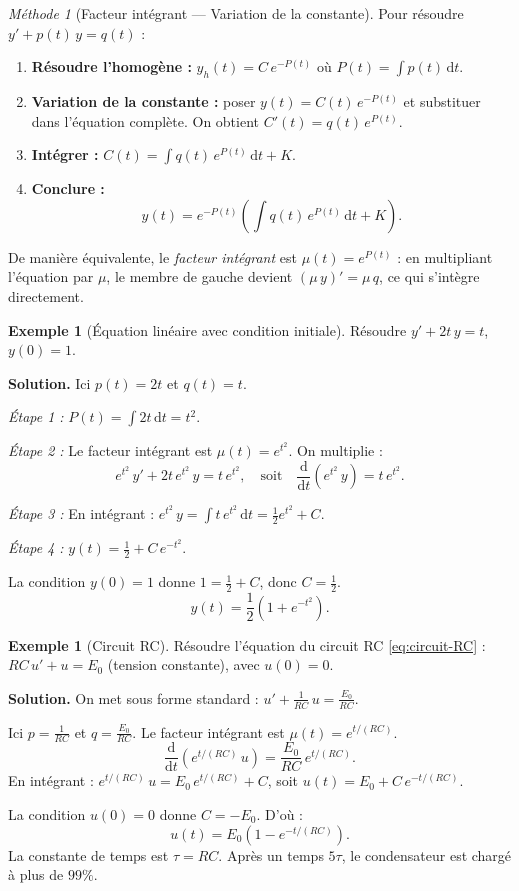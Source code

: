 \documentclass[12pt,a4paper,openany]{book}
\theoremstyle{definition}
\newtheorem{exemple}[definition]{Exemple}
\theoremstyle{plain}
\theoremstyle{remark}
\newtheorem{methode}[definition]{Méthode}
\newcommand{\dd}{\mathrm{d}}
\begin{document}
\begin{methode}[Facteur intégrant --- Variation de la constante]
\label{meth:facteur-integrant}
Pour résoudre $y' + p(t)\,y = q(t)$ :
\begin{enumerate}
\item \textbf{Résoudre l'homogène :} $y_h(t) = C\,e^{-P(t)}$ où $P(t) = \int p(t)\,\dd t$.
\item \textbf{Variation de la constante :} poser $y(t) = C(t)\,e^{-P(t)}$ et substituer dans l'équation complète. On obtient $C'(t) = q(t)\,e^{P(t)}$.
\item \textbf{Intégrer :} $C(t) = \int q(t)\,e^{P(t)}\,\dd t + K$.
\item \textbf{Conclure :}
\[
y(t) = e^{-P(t)}\left(\int q(t)\,e^{P(t)}\,\dd t + K\right).
\]
\end{enumerate}
De manière équivalente, le \emph{facteur intégrant} est $\mu(t) = e^{P(t)}$ : en multipliant l'équation par $\mu$, le membre de gauche devient $(\mu\,y)' = \mu\,q$, ce qui s'intègre directement.
\end{methode}

\begin{exemple}[Équation linéaire avec condition initiale]
\label{ex:lineaire-1}
Résoudre $y' + 2t\,y = t$, $y(0) = 1$.

\textbf{Solution.} Ici $p(t) = 2t$ et $q(t) = t$.

\textit{Étape 1 :} $P(t) = \int 2t\,\dd t = t^2$.

\textit{Étape 2 :} Le facteur intégrant est $\mu(t) = e^{t^2}$. On multiplie :
\[
e^{t^2}\,y' + 2t\,e^{t^2}\,y = t\,e^{t^2}, \quad \text{soit} \quad \frac{\dd}{\dd t}\!\left(e^{t^2}\,y\right) = t\,e^{t^2}.
\]

\textit{Étape 3 :} En intégrant : $e^{t^2}\,y = \int t\,e^{t^2}\,\dd t = \frac{1}{2}e^{t^2} + C$.

\textit{Étape 4 :} $y(t) = \frac{1}{2} + C\,e^{-t^2}$.

La condition $y(0) = 1$ donne $1 = \frac{1}{2} + C$, donc $C = \frac{1}{2}$.
\[
\boxed{y(t) = \frac{1}{2}\!\left(1 + e^{-t^2}\right).}
\]
\end{exemple}

\begin{exemple}[Circuit RC]
\label{ex:circuit-rc}
Résoudre l'équation du circuit RC \eqref{eq:circuit-RC} : $RC\,u' + u = E_0$ (tension constante), avec $u(0) = 0$.

\textbf{Solution.} On met sous forme standard : $u' + \frac{1}{RC}\,u = \frac{E_0}{RC}$.

Ici $p = \frac{1}{RC}$ et $q = \frac{E_0}{RC}$. Le facteur intégrant est $\mu(t) = e^{t/(RC)}$.
\[
\frac{\dd}{\dd t}\!\left(e^{t/(RC)}\,u\right) = \frac{E_0}{RC}\,e^{t/(RC)}.
\]
En intégrant : $e^{t/(RC)}\,u = E_0\,e^{t/(RC)} + C$, soit $u(t) = E_0 + C\,e^{-t/(RC)}$.

La condition $u(0) = 0$ donne $C = -E_0$. D'où :
\[
\boxed{u(t) = E_0\!\left(1 - e^{-t/(RC)}\right).}
\]
La constante de temps est $\tau = RC$. Après un temps $5\tau$, le condensateur est chargé à plus de $99\%$.
\end{exemple}
\end{document}
